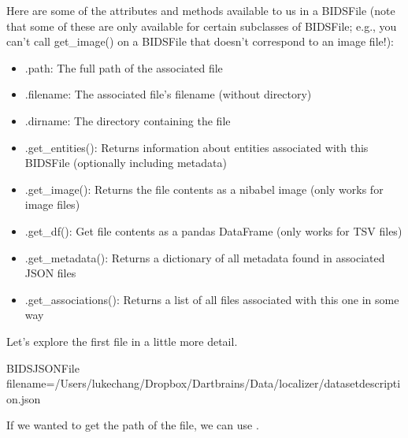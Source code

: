 \documentclass[letterpaper,10pt,english]{sphinxmanual}
\begin{document}
Here are some of the attributes and methods available to us in a BIDSFile (note that some of these are only available for certain subclasses of BIDSFile; e.g., you can’t call get\_image() on a BIDSFile that doesn’t correspond to an image file!):
\begin{itemize}
\item {} 
.path: The full path of the associated file

\item {} 
.filename: The associated file’s filename (without directory)

\item {} 
.dirname: The directory containing the file

\item {} 
.get\_entities(): Returns information about entities associated with this BIDSFile (optionally including metadata)

\item {} 
.get\_image(): Returns the file contents as a nibabel image (only works for image files)

\item {} 
.get\_df(): Get file contents as a pandas DataFrame (only works for TSV files)

\item {} 
.get\_metadata(): Returns a dictionary of all metadata found in associated JSON files

\item {} 
.get\_associations(): Returns a list of all files associated with this one in some way

\end{itemize}

Let’s explore the first file in a little more detail.

\begin{sphinxVerbatim}[commandchars=\\\{\}]
  \PYG{p}{[}\PYG{p}{]}
\end{sphinxVerbatim}

\begin{sphinxVerbatim}[commandchars=\\\{\}]
\PYGZlt{}BIDSJSONFile filename=\PYGZsq{}/Users/lukechang/Dropbox/Dartbrains/Data/localizer/dataset\PYGZus{}description.json\PYGZsq{}\PYGZgt{}
\end{sphinxVerbatim}

If we wanted to get the path of the file, we can use .
\end{document}
